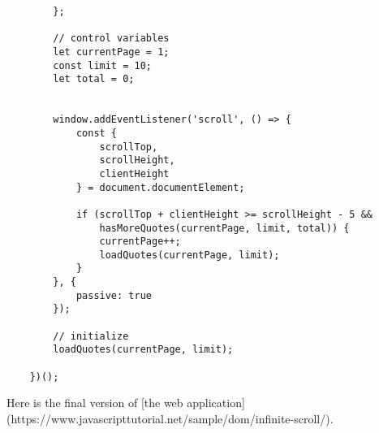 \documentclass[11pt]{article}
\begin{document}
\begin{lstlisting}
        };

        // control variables
        let currentPage = 1;
        const limit = 10;
        let total = 0;


        window.addEventListener('scroll', () => {
            const {
                scrollTop,
                scrollHeight,
                clientHeight
            } = document.documentElement;

            if (scrollTop + clientHeight >= scrollHeight - 5 &&
                hasMoreQuotes(currentPage, limit, total)) {
                currentPage++;
                loadQuotes(currentPage, limit);
            }
        }, {
            passive: true
        });

        // initialize
        loadQuotes(currentPage, limit);

    })();
\end{lstlisting}

\noindent
Here is the final version of [the web application](https://www.javascripttutorial.net/sample/dom/infinite-scroll/).
\end{document}
